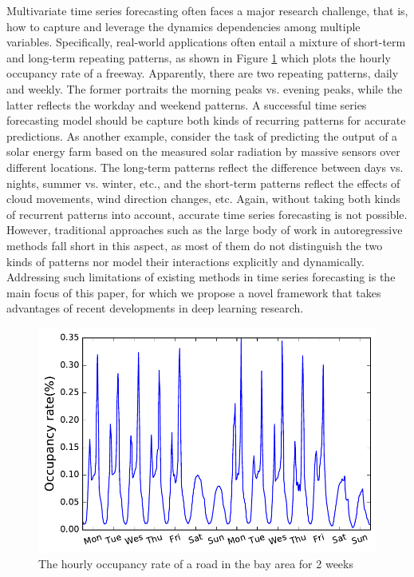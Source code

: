 Multivariate time series forecasting often faces a major research challenge, that is, how to capture and leverage the dynamics dependencies among multiple variables.  Specifically,  
real-world applications often entail a mixture of short-term and long-term repeating patterns, as shown in Figure \ref{fig:tra-ex} which plots the hourly occupancy rate of a freeway.
Apparently, there are two repeating patterns, daily and weekly. The former portraits the morning peaks vs. evening peaks, while the latter reflects the workday and weekend patterns. A successful time series forecasting model should be capture both kinds of recurring patterns for accurate predictions. As another example, consider the task of predicting the output of a solar energy farm based on the measured solar radiation by massive sensors over different locations.  The long-term patterns reflect the difference between days vs. nights, summer vs. winter, etc., and the short-term patterns reflect the effects of cloud movements, wind direction changes, etc.  Again, without taking both kinds of recurrent patterns into account, accurate time series forecasting is not possible.  However, traditional approaches such as the large body of work in autoregressive methods \cite{hamilton1994time, box2015time,zhang2003time,Yu_NIPS_16,li2014forecasting} fall short in this aspect, as most of them do not distinguish the two kinds of patterns nor model their interactions explicitly and dynamically. Addressing such limitations of existing methods in time series forecasting is the main focus of this paper, for which we propose a novel framework that takes advantages of recent developments in deep learning research.
    
    \begin{figure}[!t]
    	\centering
        \includegraphics[width=.45\textwidth]{fig/instance.pdf}
        \caption{The hourly occupancy rate of a road in the bay area for 2 weeks}
        \label{fig:tra-ex}
    \end{figure}
    

